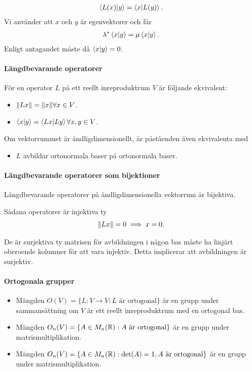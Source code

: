 \proof
\begin{align*}
	\bra{L(x)}\ket{y} = \bra{x}\ket{L(y)}.
\end{align*}
Vi använder att $x$ och $y$ är egenvektorer och får
\begin{align*}
	\lambda^{*}\bra{x}\ket{y} = \mu\bra{x}\ket{y}.
\end{align*}
Enligt antagandet måste då $\bra{x}\ket{y} = 0$.

\paragraph{Längdbevarande operatorer}
För en operator $L$ på ett reellt inreproduktrum $V$ är följande ekvivalent:
\begin{itemize}
	\item $\norm{Lx} = \norm{x}\forall x\in V$.
	\item $\bra{x}\ket{y} = \bra{Lx}\ket{Ly}\forall x, y\in V$.
\end{itemize}
Om vektorrummet är ändligdimensionellt, är påståenden även ekvivalenta med
\begin{itemize}
	\item $L$ avbildar ortonormala baser på ortonormala baser.
\end{itemize}

\proof

\paragraph{Längdbevarande operatorer som bijektioner}
Längdbevarande operatorer på ändligdimensionella vektorrum är bijektiva.

\proof
Sådana operatorer är injektiva ty
\begin{align*}
	\norm{Lx} = 0 \implies x = 0.
\end{align*}

De är surjektiva ty matrisen för avbildningen i någon bas måste ha linjärt oberoende kolumner för att vara injektiv. Detta implicerar att avbildningen är surjektiv.

\paragraph{Ortogonala grupper}
\begin{itemize}
	\item Mängden $O(V) = \{L: V\to V: L\text{ är ortogonal}\}$ är en grupp under sammansättning om $V$ är ett reellt inreproduktrum med en ortogonal bas.
	\item Mängden $O_{n}(V) = \{A\in M_{n}(\mathbb{R}): A\text{ är ortogonal}\}$ är en grupp under matrismultiplikation.
	\item Mängden $O_{n}(V) = \{A\in M_{n}(\mathbb{R}): \text{det}(A) = 1, A\text{ är ortogonal}\}$ är en grupp under matrismultiplikation.
\end{itemize}

